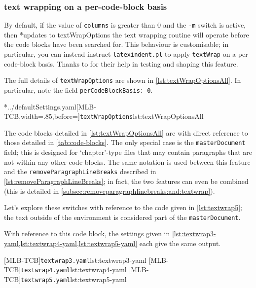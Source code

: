 \subsubsection{text wrapping on a per-code-block basis}
	By default, if the value of \texttt{columns} is greater than 0 and the
	\texttt{-m} switch is active, then%
	*{updates to textWrapOptions} the text wrapping routine will operate before the code blocks
	have been searched for. This behaviour is customisable; in particular, you can instead
	instruct \texttt{latexindent.pl} to apply \texttt{textWrap} on a
	per-code-block basis. Thanks to \cite{zoehneto} for their help in testing and
	shaping this feature.

	The full details of \texttt{textWrapOptions} are shown in \cref{lst:textWrapOptionsAll}.
	In particular, note the field \texttt{perCodeBlockBasis: 0}.

	\cmhlistingsfromfile[style=textWrapOptionsAll]*{../defaultSettings.yaml}[MLB-TCB,width=.85\linewidth,before=\centering]{\texttt{textWrapOptions}}{lst:textWrapOptionsAll}

	The code blocks detailed in \cref{lst:textWrapOptionsAll} are with direct reference to
	those detailed in \vref{tab:code-blocks}. The only special case is the
	\texttt{masterDocument} field; this is designed for `chapter'-type files that may
	contain paragraphs that are not within any other code-blocks. The same notation is used
	between this feature and the \texttt{removeParagraphLineBreaks} described in
	\vref{lst:removeParagraphLineBreaks}; in fact, the two features can even be combined (this is
	detailed in \vref{subsec:removeparagraphlinebreaks:and:textwrap}).

	Let's explore these switches with reference to the code given in
	\cref{lst:textwrap5}; the text outside of the environment is considered part of
	the \texttt{masterDocument}.

	\begin{widepage}
	\end{widepage}

	With reference to this code block, the settings given in \cref{lst:textwrap3-yaml,lst:textwrap4-yaml,lst:textwrap5-yaml} each
	give the same output.

	\begin{cmhtcbraster}[raster columns=3,
			raster left skip=-3.5cm,
			raster right skip=-2cm,
			raster column skip=.03\linewidth]
		[MLB-TCB]{\texttt{textwrap3.yaml}}{lst:textwrap3-yaml}
		[MLB-TCB]{\texttt{textwrap4.yaml}}{lst:textwrap4-yaml}
		[MLB-TCB]{\texttt{textwrap5.yaml}}{lst:textwrap5-yaml}
	\end{cmhtcbraster}

